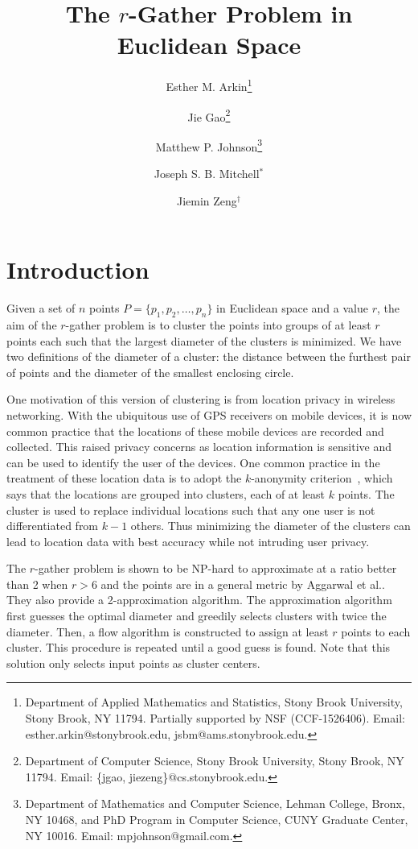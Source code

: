 \documentclass{acm_proc_article-sp}
\begin{document}
\title{The {\huge$r$}-Gather Problem in Euclidean Space}
\author{Esther M. Arkin\thanks{Department of Applied Mathematics and Statistics, Stony Brook University, Stony Brook, NY 11794. Partially supported by NSF (CCF-1526406). Email: esther.arkin@stonybrook.edu, jsbm@ams.stonybrook.edu.} \and Jie Gao\thanks{Department of Computer Science, Stony Brook University, Stony Brook, NY 11794. Email: \{jgao, jiezeng\}@cs.stonybrook.edu.} \and Matthew P. Johnson\thanks{Department of Mathematics and Computer Science, Lehman College, Bronx, NY 10468, and PhD Program in Computer Science, CUNY Graduate Center, NY 10016. Email: mpjohnson@gmail.com.} \and Joseph S. B. Mitchell$^{\ast}$ \and Jiemin Zeng$^{\dagger}$}
\maketitle

%

\section{Introduction}
Given a set of $n$ points $P = \{p_1, p_2, \dots, p_n\}$ in Euclidean space and a value $r$, the aim of the $r$-gather problem is to cluster the points into groups of at least $r$ points each such that the largest diameter of the clusters is minimized. We have two definitions of the diameter of a cluster: the distance between the furthest pair of points and the diameter of the smallest enclosing circle.

One motivation of this version of clustering is from location privacy in wireless networking. With the ubiquitous use of GPS receivers on mobile devices, it is now common practice that the locations of these mobile devices are recorded and collected. This raised privacy concerns as location information is sensitive and can be used to identify the user of the devices. One common practice in the treatment of these location data is to adopt the $k$-anonymity criterion~\cite{Sweeney02}, which says that the locations are grouped into clusters, each of at least $k$ points. The cluster is used to replace individual locations such that any one user is not differentiated from $k-1$ others. Thus minimizing the diameter of the clusters can lead to location data with best accuracy while not intruding user privacy. 

The $r$-gather problem is shown to be NP-hard to approximate at a ratio better than 2 when $r > 6$ and the points are in a general metric by Aggarwal et al.\cite{Aggarwal06achievinganonymity}.  They also provide a 2-approximation algorithm.  The approximation algorithm first guesses the optimal diameter and greedily selects clusters with twice the diameter.  Then, a flow algorithm is constructed to assign at least $r$ points to each cluster.  This procedure is repeated until a good guess is found.  Note that this solution only selects input points as cluster centers.
\end{document}
